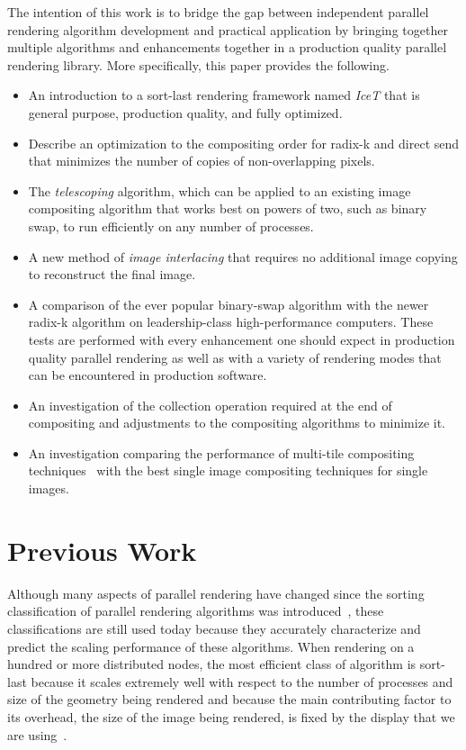 \documentclass{vgtc}                          %
\newcommand*{\lcite}[1]{~\cite{#1}}
\newcommand*{\keyterm}[1]{\emph{#1}}
\begin{document}
The intention of this work is to bridge the gap between independent
parallel rendering algorithm development and practical application by
bringing together multiple algorithms and enhancements together in a
production quality parallel rendering library.  More specifically, this
paper provides the following.

\begin{itemize}
\item An introduction to a sort-last rendering framework named
  \keyterm{IceT} that is general purpose, production quality, and fully
  optimized.
\item Describe an optimization to the compositing order for radix-k and
  direct send that minimizes the number of copies of non-overlapping
  pixels.
\item The \keyterm{telescoping} algorithm, which can be applied to an
  existing image compositing algorithm that works best on powers of two,
  such as binary swap, to run efficiently on any number of processes.
\item A new method of \keyterm{image interlacing} that requires no
  additional image copying to reconstruct the final image.
\item A comparison of the ever popular binary-swap algorithm with the newer
  radix-k algorithm on leadership-class high-performance computers.  These
  tests are performed with every enhancement one should expect in
  production quality parallel rendering as well as with a variety of
  rendering modes that can be encountered in production software.
\item An investigation of the collection operation required at the end of
  compositing and adjustments to the compositing algorithms to minimize
  it.
\item An investigation comparing the performance of multi-tile compositing
  techniques\lcite{Moreland2001} with the best single image compositing
  techniques for single images.
\end{itemize}

\section{Previous Work}
\label{sec:PreviousWork}

Although many aspects of parallel rendering have changed since the sorting
classification of parallel rendering algorithms was
introduced\lcite{Molnar1994}, these classifications are still used today
because they accurately characterize and predict the scaling performance of
these algorithms.  When rendering on a hundred or more distributed nodes,
the most efficient class of algorithm is sort-last because it scales
extremely well with respect to the number of processes and size of the
geometry being rendered and because the main contributing factor to its
overhead, the size of the image being rendered, is fixed by the display
that we are using\lcite{Wylie2001}.
\end{document}
